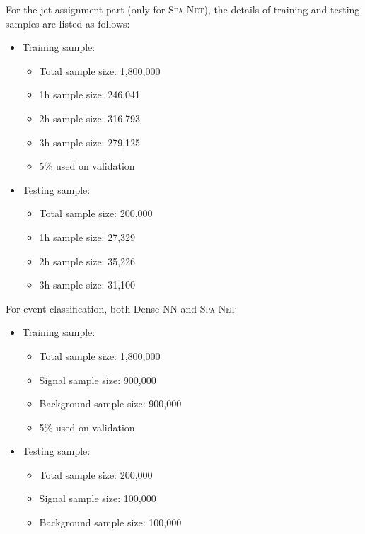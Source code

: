 \documentclass[12pt]{article}
\begin{document}
        For the jet assignment part (only for \textsc{Spa-Net}), the details of training and testing samples are listed as follows:

        \begin{itemize}
            \item Training sample:
            \begin{itemize}
                \item Total sample size: 1,800,000
                \item 1h sample size: 246,041
                \item 2h sample size: 316,793
                \item 3h sample size: 279,125
                \item 5\% used on validation
            \end{itemize}
            \item Testing sample:
            \begin{itemize}
                \item Total sample size: 200,000
                \item 1h sample size: 27,329
                \item 2h sample size: 35,226
                \item 3h sample size: 31,100
            \end{itemize}
        \end{itemize}

        For event classification, both Dense-NN and \textsc{Spa-Net}
        \begin{itemize}
            \item Training sample:
            \begin{itemize}
                \item Total sample size: 1,800,000
                \item Signal sample size: 900,000
                \item Background sample size: 900,000
                \item 5\% used on validation
            \end{itemize}
            \item Testing sample:
            \begin{itemize}
                \item Total sample size: 200,000
                \item Signal sample size: 100,000
                \item Background sample size: 100,000
            \end{itemize}
        \end{itemize}
\end{document}
